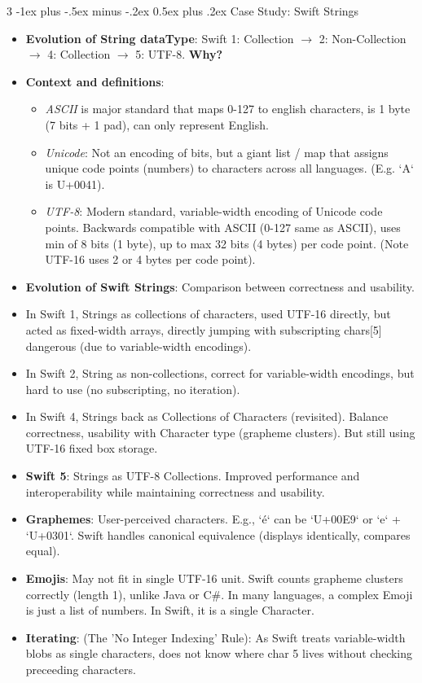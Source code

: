 \documentclass[a4paper, 9pt, landscape]{extarticle}
\makeatletter
\renewcommand{\subsection}{\@startsection{subsubsection}{3}{0mm}%
                                {-1ex plus -.5ex minus -.2ex}%
                                {0.5ex plus .2ex}%
                                {\normalfont\small\bfseries}}
\makeatother
\begin{document}
\begin{multicols*}{3}
\subsection{Case Study: Swift Strings}
\begin{itemize}
  \item \textbf{Evolution of String dataType}: Swift 1: Collection $\rightarrow$ 2: Non-Collection $\rightarrow$ 4: Collection $\rightarrow$ 5: UTF-8. \textbf{Why?}
  \item \textbf{Context and definitions}: 
    \begin{itemize}
      \item \textit{ASCII} is major standard that maps 0-127 to english characters, is 1 byte (7 bits + 1 pad), can only represent English.
      \item \textit{Unicode}: Not an encoding of bits, but a giant list / map that assigns unique code points (numbers) to characters across all languages. (E.g. `A` is U+0041).
      \item \textit{UTF-8}: Modern standard, variable-width encoding of Unicode code points. Backwards compatible with ASCII (0-127 same as ASCII), uses min of 8 bits (1 byte), up to max 32 bits (4 bytes) per code point. (Note UTF-16 uses 2 or 4 bytes per code point).
    \end{itemize}
  \item \textbf{Evolution of Swift Strings}: Comparison between correctness and usability.
  \item In Swift 1, Strings as collections of characters, used UTF-16 directly, but acted as fixed-width arrays, directly jumping with subscripting chars[5] dangerous (due to variable-width encodings). 
  \item In Swift 2, String as non-collections, correct for variable-width encodings, but hard to use (no subscripting, no iteration).
  \item In Swift 4, Strings back as Collections of Characters (revisited). Balance correctness, usability with Character type (grapheme clusters). But still using UTF-16 fixed box storage.
  \item \textbf{Swift 5}: Strings as UTF-8 Collections. Improved performance and interoperability while maintaining correctness and usability.
  \item \textbf{Graphemes}: User-perceived characters. E.g., `é` can be `U+00E9` or `e` + `U+0301`. Swift handles canonical equivalence (displays identically, compares equal).
  \item \textbf{Emojis}: May not fit in single UTF-16 unit. Swift counts grapheme clusters correctly (length 1), unlike Java or C\#. In many languages, a complex Emoji is just a list of numbers. In Swift, it is a single Character.
  \item \textbf{Iterating}: (The 'No Integer Indexing' Rule): As Swift treats variable-width blobs as single characters, does not know where char 5 lives without checking preceeding characters.
\end{itemize}



\end{multicols*}
\end{document}
